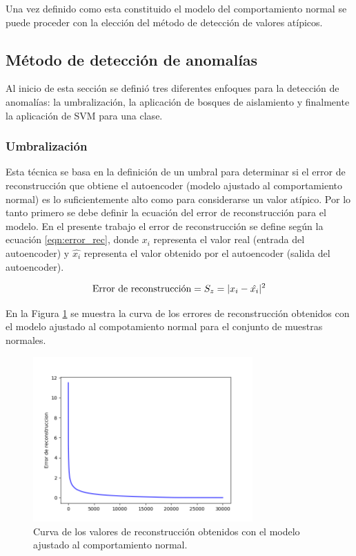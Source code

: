 \vspace{5mm} %

Una vez definido como esta constituido el modelo del comportamiento normal se puede proceder con la elecci\'{o}n del m\'{e}todo de detecci\'{o}n de valores at\'{i}picos.

\subsection{M\'{e}todo de detecci\'{o}n de anomal\'{i}as}

Al inicio de esta secci\'{o}n se defini\'{o} tres diferentes enfoques para la detecci\'{o}n de anomal\'{i}as: la umbralizaci\'{o}n, la aplicaci\'{o}n de bosques de aislamiento y finalmente la aplicaci\'{o}n de SVM para una clase.

\subsubsection{Umbralizaci\'{o}n}

Esta t\'{e}cnica se basa en la definici\'{o}n de un umbral para determinar si el error de reconstrucci\'{o}n  que obtiene el autoencoder (modelo ajustado al comportamiento normal) es lo suficientemente alto como para considerarse un valor at\'{i}pico. Por lo tanto primero se debe definir la ecuaci\'{o}n del error de reconstrucci\'{o}n para el modelo. En el presente trabajo el error de reconstrucci\'{o}n se define seg\'{u}n la ecuaci\'{o}n \ref{eqn:error_rec}, donde $x_{i}$ representa el valor real (entrada del autoencoder) y $\hat{x_{i}}$ representa el valor obtenido por el autoencoder (salida del autoencoder).

\begin{equation}
\textup{Error de reconstrucci\'{o}n} = S_{z} = |x_{i} - \hat{x_{i}}|^{2} 
\label{eqn:error_rec}
\end{equation}

En la Figura \ref{fig:codos} se muestra la curva de los errores de reconstrucci\'{o}n obtenidos con el modelo ajustado al compotamiento normal para el conjunto de muestras normales.

\begin{figure}[H]
        \centering
            \includegraphics[width=0.75\textwidth, frame]{imagenes/Cap5/codos}
        \caption{Curva de los valores de reconstrucci\'{o}n obtenidos con el modelo ajustado al comportamiento normal.}
		\label{fig:codos}
    \end{figure}

